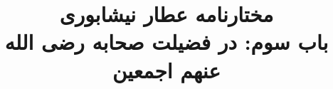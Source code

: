 \documentclass[14pt,b5paper]{article}
\begin{document}
\title{\Huge مختارنامه عطار نیشابوری \\
باب سوم: در فضیلت صحابه رضی الله عنهم اجمعین}
\author{ }
\date{ }
\maketitle
\newpage
\tableofcontents
\newpage

\newpage

\newpage

\newpage

\newpage

\newpage

\newpage
\end{document}
